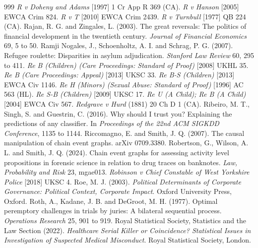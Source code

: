 \begin{thebibliography}{999}
 \emph{R v Doheny and Adams} [1997] 1 Cr App R 369 (CA).
 \emph{R v Hanson} [2005] EWCA Crim 824.
 \emph{R v T} [2010] EWCA Crim 2439.
 \emph{R v Turnbull} [1977] QB 224 (CA).
 Rajan, R. G. and Zingales, L. (2003). The great reversals: The politics of financial development in the twentieth century. \emph{Journal of Financial Economics} 69, 5 to 50.
 Ramji Nogales, J., Schoenholtz, A. I. and Schrag, P. G. (2007). Refugee roulette: Disparities in asylum adjudication. \emph{Stanford Law Review} 60, 295 to 411.
 \emph{Re B (Children) (Care Proceedings: Standard of Proof)} [2008] UKHL 35.
 \emph{Re B (Care Proceedings: Appeal)} [2013] UKSC 33.
 \emph{Re B-S (Children)} [2013] EWCA Civ 1146.
 \emph{Re H (Minors) (Sexual Abuse: Standard of Proof)} [1996] AC 563 (HL).
 \emph{Re S-B (Children)} [2009] UKSC 17.
 \emph{Re U (A Child); Re B (A Child)} [2004] EWCA Civ 567.
 \emph{Redgrave v Hurd} (1881) 20 Ch D 1 (CA).
 Ribeiro, M. T., Singh, S. and Guestrin, C. (2016). Why should I trust you? Explaining the predictions of any classifier. In \emph{Proceedings of the 22nd ACM SIGKDD Conference}, 1135 to 1144.
 Riccomagno, E. and Smith, J. Q. (2007). The causal manipulation of chain event graphs. arXiv 0709.3380.
 Robertson, G., Wilson, A. L. and Smith, J. Q. (2024). Chain event graphs for assessing activity level propositions in forensic science in relation to drug traces on banknotes. \emph{Law, Probability and Risk} 23, mgae013.
 \emph{Robinson v Chief Constable of West Yorkshire Police} [2018] UKSC 4.
 Roe, M. J. (2003). \emph{Political Determinants of Corporate Governance: Political Context, Corporate Impact}. Oxford University Press, Oxford.
 Roth, A., Kadane, J. B. and DeGroot, M. H. (1977). Optimal peremptory challenges in trials by juries: A bilateral sequential process. \emph{Operations Research} 25, 901 to 919.
 Royal Statistical Society, Statistics and the Law Section (2022). \emph{Healthcare Serial Killer or Coincidence? Statistical Issues in Investigation of Suspected Medical Misconduct}. Royal Statistical Society, London.

\end{thebibliography}
